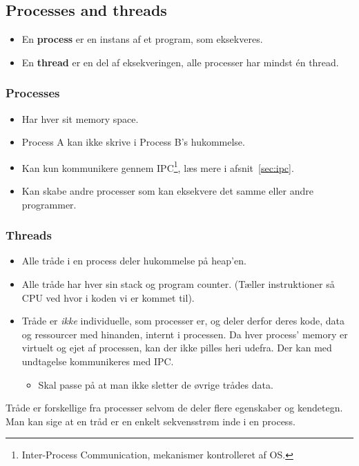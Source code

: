 \newpage

\subsection{Processes and threads}
\begin{itemize}
	\item En \textbf{process} er en instans af et program, som eksekveres.
	\item En \textbf{thread} er en del af eksekveringen, alle processer har mindst én thread.
\end{itemize}

\subsubsection{Processes}
\begin{itemize}
	\item Har hver sit memory space.
	\item Process A kan ikke skrive i Process B's hukommelse.
	\item Kan kun kommunikere gennem IPC\footnote{Inter-Process Communication, mekanismer kontrolleret af OS.}, læs mere i afsnit~\ref{sec:ipc}.
	\item Kan skabe andre processer som kan eksekvere det samme eller andre programmer.
\end{itemize}

\subsubsection{Threads}
\begin{itemize}
	\item Alle tråde i en process deler hukommelse på heap'en.
	\item Alle tråde har hver sin stack og program counter. (Tæller instruktioner så CPU ved hvor i koden vi er kommet til).
	\item Tråde er \textit{ikke} individuelle, som processer er, og deler derfor deres kode, data og ressourcer med hinanden, internt i processen. Da hver process' memory er virtuelt og ejet af processen, kan der ikke pilles heri udefra. Der kan med undtagelse kommunikeres med IPC.
	\begin{itemize}
		\item Skal passe på at man ikke sletter de øvrige trådes data.
	\end{itemize}
\end{itemize}

Tråde er forskellige fra processer selvom de deler flere egenskaber og kendetegn. Man kan sige at en tråd er en enkelt sekvensstrøm inde i en process.\\

